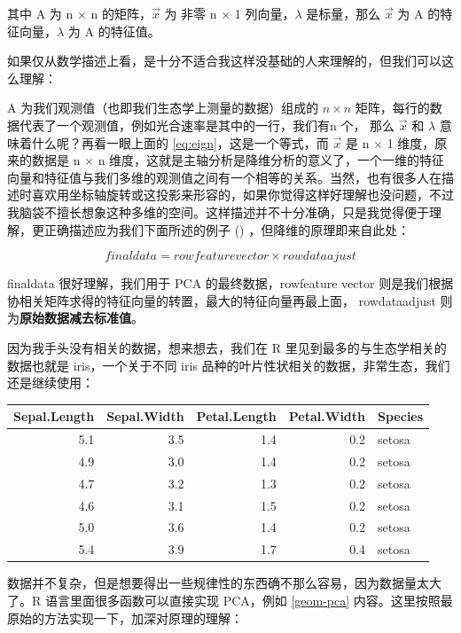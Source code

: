 \documentclass[
]{krantz}
\begin{document}
其中 A 为 n \(\times\) n 的矩阵，\(\vec{x}\) 为 非零 n \(\times\) 1 列向量，\(\lambda\) 是标量，那么 \(\vec{x}\) 为 A 的特征向量，\(\lambda\) 为 A 的特征值。

如果仅从数学描述上看，是十分不适合我这样没基础的人来理解的，但我们可以这么理解：

A 为我们观测值（也即我们生态学上测量的数据）组成的 \(n \times n\) 矩阵，每行的数据代表了一个观测值，例如光合速率是其中的一行，我们有n 个， 那么 \(\vec{x}\) 和 \(\lambda\) 意味着什么呢？再看一眼上面的 \eqref{eq:eign}，这是一个等式，而 \(\vec{x}\) 是 n \(\times\) 1 维度，原来的数据是 n \(\times\) n 维度，这就是主轴分析是降维分析的意义了，一个一维的特征向量和特征值与我们多维的观测值之间有一个相等的关系。当然，也有很多人在描述时喜欢用坐标轴旋转或这投影来形容的，如果你觉得这样好理解也没问题，不过我脑袋不擅长想象这种多维的空间。这样描述并不十分准确，只是我觉得便于理解，更正确描述应为我们下面所述的例子 (\citet{Smith2002}) ，但降维的原理即来自此处：

\begin{equation}
finaldata = rowfeaturevector \times rowdataajust
\label{eq:despca}
\end{equation}

finaldata 很好理解，我们用于 PCA 的最终数据，rowfeature vector 则是我们根据协相关矩阵求得的特征向量的转置，最大的特征向量再最上面， rowdataadjust 则为\textbf{原始数据减去标准值}。

因为我手头没有相关的数据，想来想去，我们在 R 里见到最多的与生态学相关的数据也就是 iris，一个关于不同 iris 品种的叶片性状相关的数据，非常生态，我们还是继续使用：

\begin{tabular}{r|r|r|r|l}
\hline
Sepal.Length & Sepal.Width & Petal.Length & Petal.Width & Species\\
\hline
5.1 & 3.5 & 1.4 & 0.2 & setosa\\
\hline
4.9 & 3.0 & 1.4 & 0.2 & setosa\\
\hline
4.7 & 3.2 & 1.3 & 0.2 & setosa\\
\hline
4.6 & 3.1 & 1.5 & 0.2 & setosa\\
\hline
5.0 & 3.6 & 1.4 & 0.2 & setosa\\
\hline
5.4 & 3.9 & 1.7 & 0.4 & setosa\\
\hline
\end{tabular}

数据并不复杂，但是想要得出一些规律性的东西确不那么容易，因为数据量太大了。R 语言里面很多函数可以直接实现 PCA，例如 \ref{geom-pca} 内容。这里按照最原始的方法实现一下，加深对原理的理解：
\end{document}

